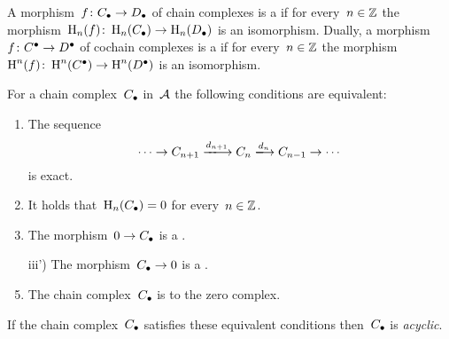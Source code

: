 \begin{definition}
  A morphism~$f \colon C_\bullet \to D_\bullet$ of chain complexes is a \emph{{\qim}} if for every~$n \in \mathbb{Z}$ the morphism~$\operatorname{H}_n(f) \colon \operatorname{H}_n(C_\bullet) \to \operatorname{H}_n(D_\bullet)$ is an isomorphism.
  Dually, a morphism~$f \colon C^\bullet \to D^\bullet$ of cochain complexes is a \emph{{\qim}} if for every~$n \in \mathbb{Z}$ the morphism~$\operatorname{H}^n(f) \colon \operatorname{H}^n(C^\bullet) \to \operatorname{H}^n(D^\bullet)$ is an isomorphism.
\end{definition}


\begin{remarkdefinition}
  For a chain complex~$C_\bullet$ in~$\mathcal{A}$ the following conditions are equivalent:
  \begin{enumerate}
    \item
      The sequence
      \[
        \dotsb
        \to
        C_{n+1}
        \xlongto{d_{n+1}}
        C_n
        \xlongto{d_n}
        C_{n-1}
        \to
        \dotsb
      \]
      is exact.
    \item
      It holds that~$\operatorname{H}_n(C_\bullet) = 0$ for every~$n \in \mathbb{Z}$.
    \item
      The morphism~$0 \to C_\bullet$ is a {\qim}.
    \item[iii')]
      The morphism~$C_\bullet \to 0$ is a {\qim}.
    \item
      The chain complex~$C_\bullet$ is {\qic} to the zero complex.
  \end{enumerate}
  If the chain complex~$C_\bullet$ satisfies these equivalent conditions then~$C_\bullet$ is \emph{acyclic}.
\end{remarkdefinition}


